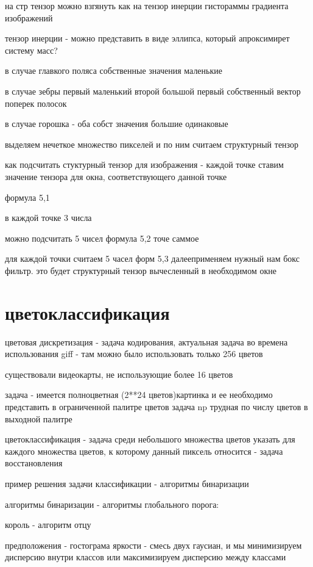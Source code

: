\documentclass[]{report}
\begin{document}
на стр тензор можно взгянуть как на тензор инерции гистораммы градиента изображений

тензор инерции - можно представить в виде эллипса, который апроксимирет систему масс?

в случае главкого поляса собственные значения маленькие

в случае зебры первый маленький второй большой
первый собственный вектор поперек полосок

в случае горошка - оба собст значения большие одинаковые

выделяем нечеткое множество пикселей и по ним считаем структурный тензор

как подсчитать стуктурный тензор для изображения - каждой точке ставим значение тензора для окна, соответствующего данной точке

формула 5,1

в каждой точке 3 числа

можно подсчитать 5 чисел формула 5,2
точе саммое


для каждой точки считаем 5 часел форм 5,3 далееприменяем нужный нам бокс фильтр. это будет структурный тензор вычесленный в необходимом окне

\section{цветоклассификация}

цветовая дискретизация - задача кодирования, актуальная задача во времена использования giff - там можно было использовать только 256 цветов

существовали видеокарты, не использующие более 16 цветов

задача - имеется полноцветная (2**24 цветов)картинка и ее необходимо представить в ограниченной палитре цветов
задача np трудная по числу цветов в выходной палитре


цветоклассификация - задача среди небольшого множества цветов указать для каждого множества цветов, к которому данный пиксель относится - задача восстановления

пример решения задачи классификации - алгоритмы бинаризации

алгоритмы бинаризации - алгоритмы глобального порога:

король - алгоритм отцу

предположения - гостограма яркости - смесь двух гаусиан, и мы минимизируем дисперсию внутри классов или максимизируем дисперсию между классами
\end{document}
